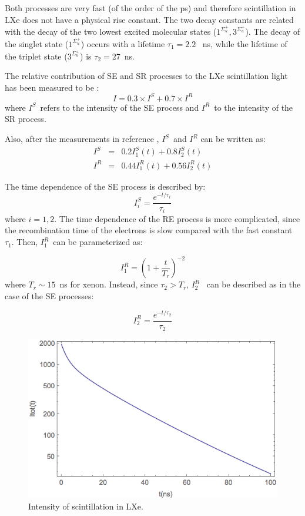 \documentclass[review]{elsarticle}
\begin{document}
Both processes are very fast (of the order of the ps) and therefore scintillation in LXe does not have a physical rise constant. The two decay constants are related with the decay of the two lowest excited molecular states 
($1^{\Sigma_u^+},3^{\Sigma_u^+}$). The decay of the singlet state 
($1^{\Sigma_u^+}$) occurs with a lifetime $\tau_1 =2.2$~ ns, while the lifetime of the triplet state ($3^{\Sigma_u^+}$) is $\tau_2 =27$~ns.

The relative contribution of SE and SR processes to the LXe scintillation light has been measured to be \cite{Kubota79}:
\begin{equation}
I = 0.3\times I^S + 0.7\times I^R
\end{equation}
%
where $I^S$~refers to the intensity of the SE process and $I^R$~to the intensity of the SR process.

Also, after the measurements in reference \cite{Kubota79}, $I^S$~and $I^R$ can be written as:
\begin{eqnarray}
I^S & = & 0.2 I_1^S(t) +  0.8 I_2^S(t) \\
 I^R & = & 0.44 I_1^R(t) +  0.56 I_2^R(t)
\end{eqnarray}

The time dependence of the SE process is described by:
\begin{equation}
I^S_i = \frac{e^{-t/\tau_i}}{\tau_i}
\end{equation}
%
where $i=1,2$. The time dependence of the RE process is more complicated, since the recombination time
of the electrons is slow compared with the fast constant $\tau_1$. Then, $I^R_1$~can be parameterized \cite{Kubota79} as: 

\begin{equation}
I^R_1 =(1 + \frac{t}{T_r})^{-2}
\end{equation}
%
where $T_r \sim 15$~ns for xenon. Instead, since $\tau_2 > T_r$, $I^R_2$~ can be described as in the case of the SE processes: 

\begin{equation}
I^R_2 =\frac{e^{-t/\tau_2}}{\tau_2}
\end{equation}

\begin{figure}[!bhtp]
	\centering
	\includegraphics[scale=0.6]{../img/LXeScintillation2.png}
	\caption{\label{fig.scint} Intensity of scintillation in LXe. }
\end{figure}
\end{document}
